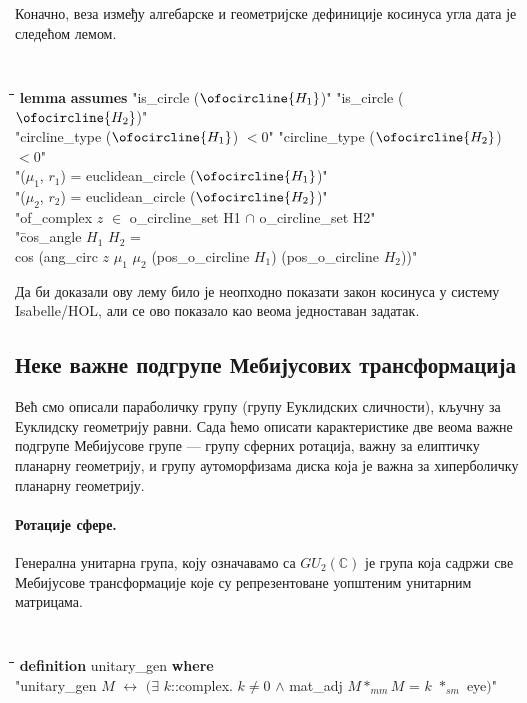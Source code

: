 \noindent Коначно, веза између алгебарске и геометријске дефиниције
косинуса угла дата је следећом лемом.

{\tt
  \begin{tabbing}
    \hspace{5mm}\=\hspace{5mm}\=\hspace{5mm}\=\hspace{5mm}\=\hspace{5mm}\=\kill
{\bf lemma} {\bf assumes} "is\_circle ($\ofocircline{H_1}$)" "is\_circle ($\ofocircline{H_2}$)"\\
\>\>  "circline\_type ($\ofocircline{H_1}$) $< 0$" "circline\_type ($\ofocircline{H_2}$) $< 0$"\\
\>\>  "($\mu_1$, $r_1$) = euclidean\_circle ($\ofocircline{H_1}$)"\\
\>\>  "($\mu_2$, $r_2$) = euclidean\_circle ($\ofocircline{H_2}$)"\\
\>\>  "of\_complex $z$ $\in$ o\_circline\_set H1 $\cap$ o\_circline\_set H2"\\
 "\=cos\_angle $H_1$ $H_2$ = \\
\>\>cos (ang\_circ $z$ $\mu_1$ $\mu_2$ (pos\_o\_circline $H_1$) (pos\_o\_circline $H_2$))"
  \end{tabbing}
}
\noindent Да би доказали ову лему било је неопходно показати закон
косинуса у систему Isabelle/HOL, али се ово показало као веома
једноставан задатак.


\subsection{Неке важне подгрупе Мебијусових трансформација}
\label{subsec:classification}

Већ смо описали параболичку групу (групу Еуклидских сличности), кључну
за Еуклидску геометрију равни. Сада ћемо описати карактеристике две
веома важне подгрупе Мебијусове групе --- групу сферних ротација,
важну за елиптичку планарну геометрију, и групу аутоморфизама диска
која је важна за хиперболичку планарну геометрију.

\paragraph{Ротације сфере.}
Генерална унитарна група, коју означавамо са $GU_2(\mathbb{C})$ је
група која садржи све Мебијусове трансформације које су репрезентоване
уопштеним унитарним матрицама.  {\tt
  \begin{tabbing}
    \hspace{3mm}\=\hspace{5mm}\=\hspace{5mm}\=\hspace{5mm}\=\hspace{5mm}\=\kill
{\bf definition} unitary\_gen {\bf where}\\
\>"unitary\_gen $M$ $\longleftrightarrow$ $(\exists$ $k$::complex. $k \neq 0$ $\wedge$ mat\_adj $M *_{mm} M$ = $k$ $*_{sm}$ eye$)$"
  \end{tabbing}
}

